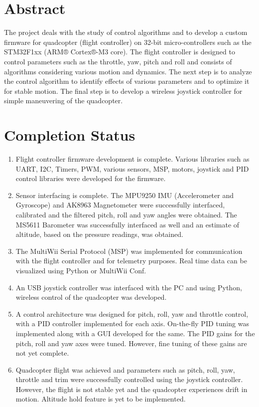 \documentclass[a4paper,12pt,oneside]{book}
\begin{document}
\section{Abstract}
The project deals with the study of control algorithms and to develop a custom firmware for quadcopter (flight controller) on 32-bit micro-controllers such as the STM32F1xx (ARM® Cortex®-M3 core). The flight controller is designed to control parameters such as the throttle, yaw, pitch and roll and consists of algorithms considering various motion and dynamics. The next step is to analyze the control algorithm to identify effects of various parameters and to optimize it for stable motion. The final step is to develop a wireless joystick controller for simple maneuvering of the quadcopter. 

\section{Completion Status}
\begin{enumerate}
\item Flight controller firmware development is complete. Various libraries such as UART, I2C, Timers, PWM, various sensors, MSP, motors, joystick and PID control libraries were developed for the firmware.

\item Sensor interfacing is complete. The MPU9250 IMU (Accelerometer and Gyroscope) and AK8963 Magnetometer were successfully interfaced, calibrated and the filtered pitch, roll and yaw angles were obtained. The MS5611 Barometer was successfully interfaced as well and an estimate of altitude, based on the pressure readings, was obtained.

\item The MultiWii Serial Protocol (MSP) was implemented for communication with the flight controller and for telemetry purposes. Real time data can be visualized using Python or MultiWii Conf.

\item An USB joystick controller was interfaced with the PC and using Python, wireless control of the quadcopter was developed.

\item A control architecture was designed for pitch, roll, yaw and throttle  control, with a PID controller implemented for each axis. On-the-fly PID tuning was implemented along with a GUI developed for the same. The PID gains for the pitch, roll and yaw axes were tuned. However, fine tuning of these gains are not yet complete.

\item Quadcopter flight was achieved and parameters such as pitch, roll, yaw, throttle and trim were successfully controlled using the joystick controller. However, the flight is not stable yet and the quadcopter experiences drift in motion. Altitude hold feature is yet to be implemented.\\
\end{enumerate}
\end{document}
